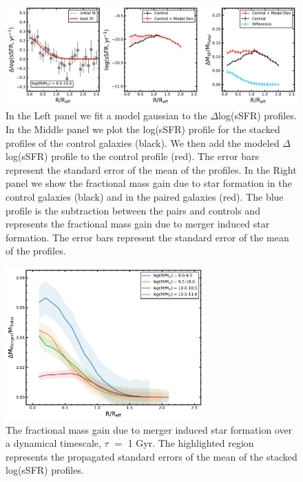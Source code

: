 \documentclass[iop,revtex4,twocolumn,apj,numberedappendix,appendixfloats]{emulateapj}
\begin{document}
\begin{figure}
\centering
\includegraphics[width=\linewidth]{fig/mass_gain_1.pdf}
\caption[Example of the calculation of the fractional mass gain due to merger induced star formation for a single mass bin.]{In the Left panel we fit a model gaussian to the $\Delta$log(sSFR) profiles. In the Middle panel we plot the log(sSFR) profile for the stacked profiles of the control galaxies (black). We then add the modeled $\Delta$log(sSFR) profile to the control profile (red). The error bars represent the standard error of the mean of the profiles. In the Right panel we show the fractional mass gain due to star formation in the control galaxies (black) and in the paired galaxies (red). The blue profile is the subtraction between the pairs and controls and represents the fractional mass gain due to merger induced star formation. The error bars represent the standard error of the mean of the profiles. }
\label{fig:mass_gain}
\end{figure}

\begin{figure}
\centering
\includegraphics[width=3in]{fig/mass_gain.pdf}
\caption[The fractional mass gain due to merger induced star formation.]{The fractional mass gain due to merger induced star formation over a dynamical timescale, $\tau$ $=$ 1 Gyr. The highlighted region represents the propagated standard errors of the mean of the stacked log(sSFR) profiles. }
\label{fig:mass_gain_sum}
\end{figure}
\end{document}
